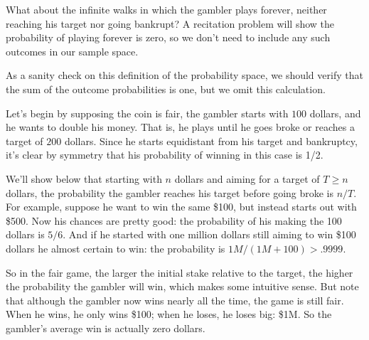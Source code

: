\begin{editingnotes}
What about the infinite walks in which the gambler plays forever, neither
reaching his target nor going bankrupt?  A recitation problem will show the
probability of playing forever is zero, so we don't need to include any
such outcomes in our sample space.

As a sanity check on this definition of the probability space, we should
verify that the sum of the outcome probabilities is one, but we omit this
calculation.

\end{editingnotes}



Let's begin by supposing the coin is fair, the gambler starts with $100$
dollars, and he wants to double his money.  That is, he plays until he
goes broke or reaches a target of $200$ dollars.  Since he starts
equidistant from his target and bankruptcy, it's clear by symmetry that
his probability of winning in this case is 1/2.

We'll show below that starting with $n$ dollars and aiming for a target of
$T \geq n$ dollars, the probability the gambler reaches his target before
going broke is $n/T$.  For example, suppose he want to win the same \$100,
but instead starts out with \$500.  Now his chances are pretty good: the
probability of his making the 100 dollars is $5/6$.  And if he started
with one million dollars still aiming to win \$100 dollars he almost
certain to win: the probability is $1M/(1M + 100) > .9999$.

So in the fair game, the larger the initial stake relative to the target,
the higher the probability the gambler will win, which makes some
intuitive sense.  But note that although the gambler now wins nearly all
the time, the game is still fair.  When he wins, he only wins \$100; when
he loses, he loses big: \$1M.  So the gambler's average win is actually
zero dollars.

